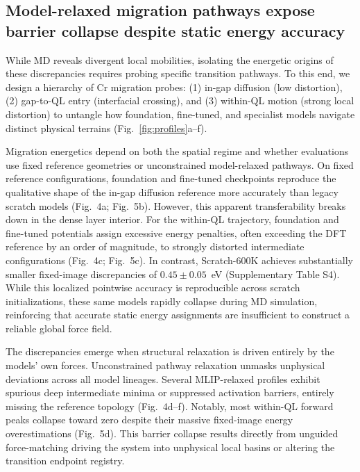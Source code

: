 \documentclass[pdflatex,sn-mathphys-num]{sn-jnl}
\begin{document}
\subsection{Model-relaxed migration pathways expose barrier collapse despite static energy accuracy}\label{sec:migration}

While MD reveals divergent local mobilities, isolating the energetic origins of these discrepancies requires probing specific transition pathways. To this end, we design a hierarchy of Cr migration probes: (1) in-gap diffusion (low distortion), (2) gap-to-QL entry (interfacial crossing), and (3) within-QL motion (strong local distortion) to untangle how foundation, fine-tuned, and specialist models navigate distinct physical terrains (Fig.~\ref{fig:profiles}a--f).

Migration energetics depend on both the spatial regime and whether evaluations use fixed reference geometries or unconstrained model-relaxed pathways. On fixed reference configurations, foundation and fine-tuned checkpoints reproduce the qualitative shape of the in-gap diffusion reference more accurately than legacy scratch models (Fig.~4a; Fig.~5b). However, this apparent transferability breaks down in the dense layer interior. For the within-QL trajectory, foundation and fine-tuned potentials assign excessive energy penalties, often exceeding the DFT reference by an order of magnitude, to strongly distorted intermediate configurations (Fig.~4c; Fig.~5c). In contrast, Scratch-600K achieves substantially smaller fixed-image discrepancies of $0.45\pm0.05$~eV (Supplementary Table S4). While this localized pointwise accuracy is reproducible across scratch initializations, these same models rapidly collapse during MD simulation, reinforcing that accurate static energy assignments are insufficient to construct a reliable global force field.

The discrepancies emerge when structural relaxation is driven entirely by the models' own forces. Unconstrained pathway relaxation unmasks unphysical deviations across all model lineages. Several MLIP-relaxed profiles exhibit spurious deep intermediate minima or suppressed activation barriers, entirely missing the reference topology (Fig.~4d--f). Notably, most within-QL forward peaks collapse toward zero despite their massive fixed-image energy overestimations (Fig.~5d). This barrier collapse results directly from unguided force-matching driving the system into unphysical local basins or altering the transition endpoint registry.
\end{document}
